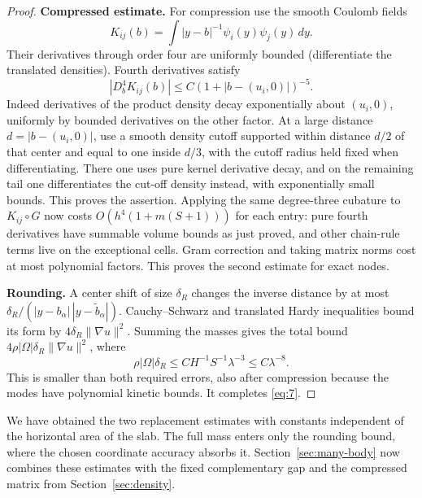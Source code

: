 \begin{proof}
\noindent\textbf{Compressed estimate.} For compression use the smooth Coulomb fields
\[
     K_{ij}(b)=\int |y-b|^{-1}\psi_i(y)\psi_j(y)\,dy .
\]
Their derivatives through order four are uniformly bounded (differentiate the translated densities). Fourth derivatives satisfy
\[
         |D_b^4 K_{ij}(b)|\le C(1+|b-(u_i,0)|)^{-5}.
\]
Indeed derivatives of the product density decay exponentially about \((u_i,0)\), uniformly by bounded derivatives on the other factor. At a large distance \(d=|b-(u_i,0)|\), use a smooth density cutoff supported within distance \(d/2\) of that center and equal to one inside \(d/3\), with the cutoff radius held fixed when differentiating. There one uses pure kernel derivative decay, and on the remaining tail one differentiates the cut-off density instead, with exponentially small bounds. This proves the assertion. Applying the same degree-three cubature to \(K_{ij}\circ G\) now costs \(O(h^4(1+m(S+1)))\) for each entry: pure fourth derivatives have summable volume bounds as just proved, and other chain-rule terms live on the exceptional cells. Gram correction and taking matrix norms cost at most polynomial factors. This proves the second estimate for exact nodes.

\noindent\textbf{Rounding.} A center shift of size \(\delta_R\)
changes the inverse distance by at most
\(\delta_R/(|y-b_\alpha|\,|y-\tilde b_\alpha|)\).
Cauchy--Schwarz and translated Hardy inequalities bound its form
by \(4\delta_R\|\nabla u\|^2\). Summing the masses gives the
total bound \(4\rho|\Omega|\delta_R\|\nabla u\|^2\), where
\[
 \rho|\Omega|\delta_R
 \le C H^{-1}S^{-1}\lambda^{-3}
 \le C\lambda^{-8}.
\]
This is smaller than both required errors, also after compression
because the modes have polynomial kinetic bounds. It completes
\eqref{eq:7}.
\end{proof}

We have obtained the two replacement estimates with constants
independent of the horizontal area of the slab. The full mass enters
only the rounding bound, where the chosen coordinate accuracy absorbs
it. Section~\ref{sec:many-body} now combines these estimates with the
fixed complementary gap and the compressed matrix from
Section~\ref{sec:density}.
